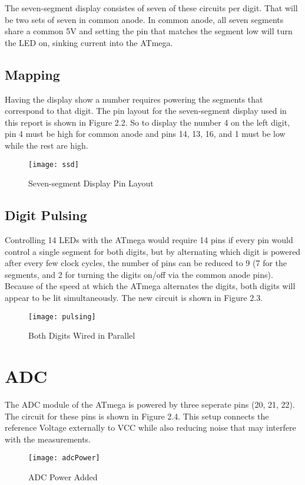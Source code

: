 \documentclass[main.tex]{subfiles}
\begin{document}
		The seven-segment display consistes of seven of these circuits per digit. That will be two sets
		of seven in common anode. In common anode, all seven segments share a common 5V and setting the
		pin that matches the segment low will turn the LED on, sinking current into the ATmega.
		
		
		\subsection{Mapping}
		Having the display show a number requires powering the segments that correspond to that digit.
		The pin layout for the seven-segment display used in this report is shown in Figure 2.2.
		So to display the number 4 on the left digit, pin 4 must be high for common anode and pins
		14, 13, 16, and 1 must be low while the rest are high.
		\begin{figure}[H]
			\begin{center}
				\texttt{[image: ssd]}
			\end{center}
			\caption{Seven-segment Display Pin Layout}
			\label{fig:sevenSegment}
		\end{figure}
		
		\subsection{Digit Pulsing}
		Controlling 14 LEDs with the ATmega would require 14 pins if every pin would control a single
		segment for both digits, but by alternating which digit is powered after every few clock cycles,
		the number of pins can be reduced to 9 (7 for the segments, and 2 for turning the digits on/off
		via the common anode pins). Because of the speed at which the ATmega alternates the digits,
		both digits will appear to be lit simultaneously. The new circuit is shown in Figure 2.3.
		\begin{figure}[H]
			\begin{center}
				\texttt{[image: pulsing]}
			\end{center}
			\caption{Both Digits Wired in Parallel}
			\label{fig:pulse}
		\end{figure}
		
	\section{ADC}
	The ADC module of the ATmega is powered by three seperate pins (20, 21, 22). The circuit for
	these pins is shown in Figure 2.4. This setup connects the reference Voltage externally to 
	VCC while also reducing noise that may interfere with the measurements.
	\begin{figure}[H]
		\begin{center}
			\texttt{[image: adcPower]}
		\end{center}
		\caption{ADC Power Added}
		\label{fig:adcPwr}
	\end{figure}
\end{document}
